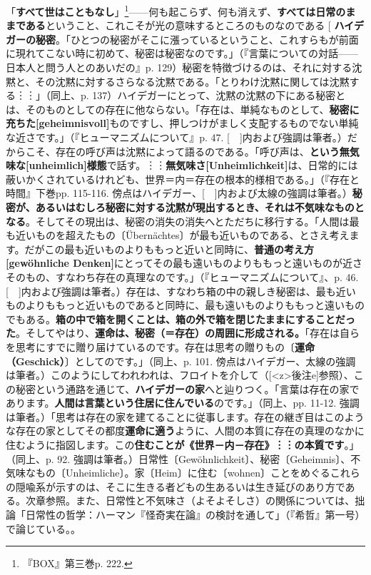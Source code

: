 \documentclass[9pt,b5j,twoside,twocolumn]{utarticle}
\makeatletter
\def\yakuchu{%
\@ifnextchar[\@xfootnote %
{\stepcounter{yakuchu}%
\protected@xdef\@thefnmark{\theyakuchu}%
\@footnotemark\@footnotetext}}
\makeatother
\begin{document}
「\textbf{すべて世はこともなし}」\footnote{『BOX』第三巻p. 222.}------何も起こらず、何も消えず、\textbf{すべては日常のままである}ということ、これこそが光の意味するところのものなのである
\yakuchu{\textbf{ハイデガーの秘密}。「ひとつの秘密がそこに漲っているということ、これすらもが前面に現れてこない時に初めて、秘密は秘密なのです。」（『言葉についての対話------日本人と問う人とのあいだの』p. 129）秘密を特徴づけるのは、それに対する沈黙と、その沈黙に対するさらなる沈黙である。「とりわけ沈黙に関しては沈黙する︙︙」（同上、p. 137）ハイデガーにとって、沈黙の沈黙の下にある秘密とは、そのものとしての存在に他ならない。「存在は、単純なものとして、\textbf{秘密に充ちた[geheimnisvoll]}ものですし、押しつけがましく支配するものでない単純な近さです。」（『ヒューマニズムについて』p. 47. [　]内および強調は筆者。）だからこそ、存在の呼び声は沈黙によって語るのである。「呼び声は、\textbf{という無気味な[unheimlich]様態}で話す。︙︙\textbf{無気味さ[Unheimlichkeit]}は、日常的には蔽いかくされているけれども、世界＝内＝存在の根本的様相である。」（『存在と時間』下巻pp. 115-116. 傍点はハイデガー、[　]内および太線の強調は筆者。）\textbf{秘密が、あるいはむしろ秘密に対する沈黙が現出するとき、それは不気味なものとなる}。そしてその現出は、秘密の消失の消失へとただちに移行する。「人間は最も近いものを超えたもの〔\"Ubern\"achtes〕が最も近いものである、とさえ考えます。だがこの最も近いものよりももっと近いと同時に、\textbf{普通の考え方[gewöhnliche Denken]}にとってその最も遠いものよりももっと遠いものが近さそのもの、すなわち存在の真理なのです。」（『ヒューマニズムについて』、p. 46. [　]内および強調は筆者。）存在は、すなわち箱の中の親しき秘密は、最も近いものよりももっと近いものであると同時に、最も遠いものよりももっと遠いものでもある。\textbf{箱の中で箱を開くことは、箱の外で箱を閉じたままにすることだった}。そしてやはり、\textbf{運命は、秘密（＝存在）の周囲に形成される。}「存在は自らを思考にすでに贈り届けているのです。存在は思考の贈りもの〔\textbf{運命（Geschick）}〕としてのです。」（同上、p. 101. 傍点はハイデガー、太線の強調は筆者。）このようにしてわれわれは、フロイトを介して（[\pbox<z>{後注e}]参照）、この秘密という通路を通じて、\textbf{ハイデガーの家}へと辿りつく。「言葉は存在の家であります。\textbf{人間は言葉という住居に住んでいる}のです。」（同上、pp. 11-12. 強調は筆者。）「思考は存在の家を建てることに従事します。存在の継ぎ目はこのような存在の家としてその都度\textbf{運命に適う}ように、人間の本質に存在の真理のなかに住むように指図します。この\textbf{住むことが《世界－内－存在》︙︙の本質です}。」（同上、p. 92. 強調は筆者。）日常性〔Gew\"ohnlichkeit〕、秘密〔Geheimnis〕、不気味なもの〔Unheimliche〕。家〔Heim〕に住む〔wohnen〕ことをめぐるこれらの隠喩系が示すのは、そこに生きる者どもの生あるいは生き延びのあり方である。次章参照。また、日常性と不気味さ（よそよそしさ）の関係については、拙論「日常性の哲学：ハーマン『怪奇実在論』の検討を通して」（『希哲』第一号）で論じている。}。
\end{document}
